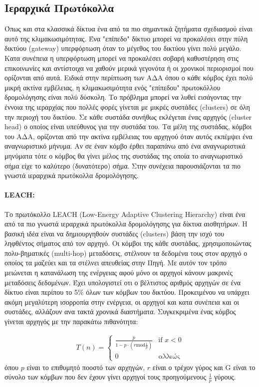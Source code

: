 \subsection{Ιεραρχικά Πρωτόκολλα}
Όπως και στα κλασσικά δίκτυα ένα από τα πιο σημαντικά ζητήματα σχεδιασμού είναι αυτό της κλιμακωσιμότητας. Ένα "επίπεδο" δίκτυο μπορεί να προκαλέσει στην πύλη
δικτύου (gateway) υπερφόρτωση όταν το μέγεθος του δικτύου γίνει πολύ μεγάλο. Κατα συνέπεια η υπερφόρτωση μπορεί να προκαλέσει σοβαρή καθυστέρηση στις επικοινωνίες
και αντίστοιχα να χαθούν μερικά γεγονότα ή οι χρονικοί περιορισμοί που ορίζονται από αυτά. Ειδικά στην περίπτωση των ΑΔΑ όπου ο κάθε κόμβος έχει πολύ μικρή ακτίνα
εμβέλειας, η κλιμακωσιμότητα ενός "επίπεδου" πρωτοκόλλου δρομολόγησης είναι πολύ δύσκολη. Το πρόβλημα μπορεί να λυθεί εισάγοντας την έννοια της ιεραρχίας που πολλές
φορές γίνεται με μικρές συστάδες (clusters) σε όλη την περιοχή του δικτύου. Σε κάθε συστάδα συνήθως εκλέγεται ένας αρχηγός (cluster head) ο οποίος είναι υπεύθυνος για
την συστάδα του. Τα μέλη της συστάδας, κόμβοι του ΑΔΑ, ορίζονται από την ακτίνα εμβέλειας του αρχηγού όταν αυτός εκπέμψει ένα αναγνωριστικό μήνυμα. Αν σε έναν κόμβο
έρθει παραπάνω από ένα αναγνωριστικά μηνύματα τότε ο κόμβος θα γίνει μέλος της συστάδας της οποία το αναγνωριστικό σήμα είχε το καλύτερο (δυνατότερο) σήμα. Στην
συνέχεια παρουσιάζονται τα πιο γνωστά ιεραρχικά πρωτόκολλα δρομολόγησης.

\paragraph{LEACH:} Το πρωτόκολλο LEACH (Low-Energy Adaptive Clustering Hierarchy) \cite{leach_protocol} είναι ένα από τα πιο γνωστά ιεραρχικά πρωτόκολλα δρομολόγησης
για δίκτυα αισθητήρων. Η βασική ιδέα είναι να δημιουργηθούν συστάδες (clusters) βάση την ισχύ του ληφθέντος σήματος από τον αρχηγό. Οι κόμβοι της κάθε συστάδας,
χρησιμοποιώντας πολυ-βηματικές (multi-hop) μεταδόσεις, στέλνουν τα δεδομένα τους στον αρχηγό ο οποίος τα μαζεύει και τα στέλνει απευθείας στην Πηγή. Με αυτόν τον
τρόπο μειώνεται η κατανάλωση της ενέργειας αφού μόνο οι αρχηγοί κάνουν μακρινές μεταδόσεις δεδομένων. Έχει υπολογιστεί οτι ο βέλτιστος αριθμός αρχηγών σε ένα δίκτυο
είναι περίπου το 5\% όλων των κόμβων του δικτύου. Προκειμένου να υπάρχει ακόμη μεγαλύτερη ισορροπία στην ενέργεια, οι αρχηγοί και κατα συνέπεια και οι συστάδες,
αλλάζουν ανα τακτά χρονικά διαστήματα. Συγκεκριμένα ένας κόμβος γίνεται αρχηγός με την παρακάτω πιθανότητα:

\begin{align*}
T(n) = \left\{
\begin{array}{cc}
 \frac{p}{1-p\cdot(r \text{mod}\frac{1}{p})} & \text{if } x<0 \\
  0 & \text{αλλιώς}
\end{array} \right.
\end{align*}
όπου $p$ είναι το επιθυμητό ποοστό των αρχηγών, $r$ είναι ο τρέχον γύρος και G είναι το σύνολο των κόμβων που δεν έχουν γίνει αρχηγοί τους προηγούμενους $\frac{1}{p}$
γύρους.

